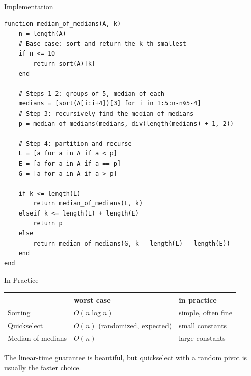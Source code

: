 \documentclass[10pt,aspectratio=169]{beamer}
\begin{document}
\begin{frame}[fragile]{Implementation}
  \begin{lstlisting}[basicstyle=\ttfamily\scriptsize]
function median_of_medians(A, k)
    n = length(A)
    # Base case: sort and return the k-th smallest
    if n <= 10
        return sort(A)[k]
    end

    # Steps 1-2: groups of 5, median of each
    medians = [sort(A[i:i+4])[3] for i in 1:5:n-n%5-4]
    # Step 3: recursively find the median of medians
    p = median_of_medians(medians, div(length(medians) + 1, 2))

    # Step 4: partition and recurse
    L = [a for a in A if a < p]
    E = [a for a in A if a == p]
    G = [a for a in A if a > p]

    if k <= length(L)
        return median_of_medians(L, k)
    elseif k <= length(L) + length(E)
        return p
    else
        return median_of_medians(G, k - length(L) - length(E))
    end
end
  \end{lstlisting}
\end{frame}

\begin{frame}{In Practice}
  \begin{center}
  \begin{tabular}{lll}
    \toprule
                        & worst case      & in practice \\
    \midrule
    Sorting             & $O(n \log n)$   & simple, often fine \\
    Quickselect         & $O(n)$ (randomized, expected)        & small constants \\
    Median of medians   & $O(n)$          & large constants \\
    \bottomrule
  \end{tabular}
  \end{center}

  \bigskip
  \begin{center}
    The linear-time guarantee is beautiful, but quickselect with a random pivot
    is usually the faster choice.
  \end{center}
\end{frame}
\end{document}
